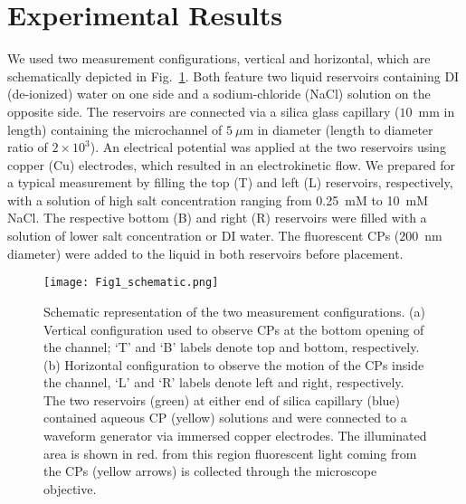 \documentclass[twoside,twocolumn,9pt]{article}
\begin{document}
\section*{Experimental Results}

We used two measurement configurations, vertical and horizontal, which are schematically depicted in Fig.~\ref{figure:setup}. Both feature two liquid reservoirs containing DI (de-ionized) water on one side and a sodium-chloride (NaCl) solution on the opposite side. The reservoirs are connected via a silica glass capillary ($10$~mm in length) containing the microchannel of $5~\mu$m in diameter (length to diameter ratio of $2 \times 10^3$). An electrical potential was applied at the two reservoirs using copper (Cu) electrodes, which resulted in an electrokinetic flow. We prepared for a typical measurement by filling the top (T) and left (L) reservoirs, respectively, with a solution of high salt concentration ranging from 0.25~mM to 10~mM NaCl. The respective bottom (B) and right (R) reservoirs were filled with a solution of lower salt concentration or DI water. The fluorescent CPs ($200$~nm diameter) were added to the liquid in both reservoirs before placement.

\begin{figure}[h]
 \centering
 \texttt{[image: Fig1\_schematic.png]}
 \caption{\label{figure:setup}Schematic representation of the two measurement configurations. (a) Vertical configuration used to observe CPs at the bottom opening of the channel; `T' and `B' labels denote top and bottom, respectively. (b) Horizontal configuration to observe the motion of the CPs inside the channel, `L' and `R' labels denote left and right, respectively. The two reservoirs (green) at either end of silica capillary (blue) contained aqueous CP (yellow) solutions and were connected to a waveform generator via immersed copper electrodes. The illuminated area is shown in red. from this region fluorescent light coming from the CPs (yellow arrows) is collected through the microscope objective.}
\end{figure}
\end{document}
